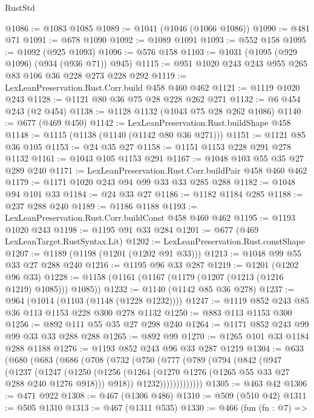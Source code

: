 \begin{lexlean}{RustStd}
\begin{coremodule}
@1086 := @1083 @1085
@1089 := @1041 (@1046 (@1066 @1086))
@1090 := @481 @71
@1091 := @678 @1090
@1092 := @1089 @1091
@1093 := @552 @158
@1095 := @1092 (@925 @1093)
@1096 := @576 @158
@1103 := @1031 (@1095 (@929 @1096) (@934 (@936 @71)) @945)
@1115 := @951 @1020 @243 @243 @955 @265 @83 @106 @36 @228 @273 @228 @292
@1119 := LexLeanPreservation.Rust.Corr.build @458 @460 @462
@1121 := @1119 @1020 @243
@1128 := @1121 @80 @36 @75 @28 @228 @262 @271
@1132 := @6 @454 @243 (@2 @454)
@1138 := @1128 @1132 (@1043 @75 @28 @262 @1086)
@1140 := @677 (@469 @450)
@1142 := LexLeanPreservation.Rust.buildShape @458
@1148 := @1115 (@1138 (@1140 (@1142 @80 @36 @271)))
@1151 := @1121 @85 @36 @105
@1153 := @24 @35 @27
@1158 := @1151 @1153 @228 @291 @278 @1132
@1161 := @1043 @105 @1153 @291
@1167 := @1048 @103 @55 @35 @27 @289 @240
@1171 := LexLeanPreservation.Rust.Corr.buildPair @458 @460 @462
@1179 := @1171 @1020 @243 @94 @99 @33 @33 @285 @288
@1182 := @1048 @94 @101 @33
@1184 := @24 @33 @27
@1186 := @1182 @1184 @285
@1188 := @237 @288 @240
@1189 := @1186 @1188
@1193 := LexLeanPreservation.Rust.Corr.buildConst @458 @460 @462
@1195 := @1193 @1020 @243
@1198 := @1195 @91 @33 @284
@1201 := @677 (@469 LexLeanTarget.RustSyntax.Lit)
@1202 := LexLeanPreservation.Rust.constShape
@1207 := @1189 (@1198 (@1201 (@1202 @91 @33)))
@1213 := @1048 @99 @55 @33 @27 @288 @240
@1216 := @1195 @96 @33 @287
@1219 := @1201 (@1202 @96 @33)
@1228 := @1158 (@1161 (@1167 (@1179 (@1207 (@1213 (@1216 @1219) @1085))) @1085))
@1232 := @1140 (@1142 @85 @36 @278)
@1237 := @964 (@1014 (@1103 (@1148 (@1228 @1232))))
@1247 := @1119 @852 @243 @85 @36 @113 @1153 @228 @300 @278 @1132
@1250 := @883 @113 @1153 @300
@1256 := @892 @111 @55 @35 @27 @298 @240
@1264 := @1171 @852 @243 @99 @99 @33 @33 @288 @288
@1265 := @892 @99
@1270 := @1265 @101 @33 @1184 @288 @1188
@1276 := @1193 @852 @243 @96 @33 @287 @1219
@1304 := @633
    (@680
      (@683
        (@686
          (@708
            (@732
              (@750
                (@777
                  (@789
                    (@794
                      (@842
                        (@947
                          (@1237
                            (@1247
                              (@1250
                                (@1256
                                  (@1264 (@1270 @1276 (@1265 @55 @33 @27 @288 @240 @1276 @918)))
                                  @918))
                              @1232)))))))))))))
@1305 := @463 @42
@1306 := @471 @922
@1308 := @467 (@1306 @486)
@1310 := @509 (@510 @42)
@1311 := @505 @1310
@1313 := @467 (@1311 @535)
@1330 := @466
    (fun (fn : @7) =>

\end{coremodule}
\end{lexlean}
